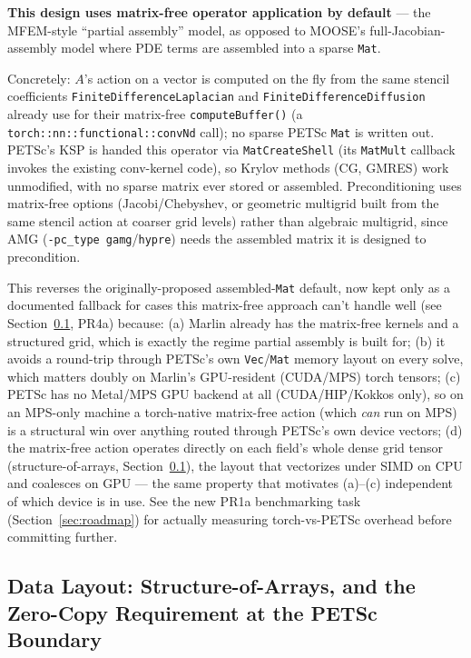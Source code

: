 \documentclass[11pt]{article}
\begin{document}
\begin{tcolorbox}[colback=lightgray, colframe=marlinblue, boxrule=0.6pt, arc=1mm]
\textbf{This design uses matrix-free operator application by default} ---
the MFEM-style ``partial assembly'' model, as opposed to MOOSE's
full-Jacobian-assembly model where PDE terms are assembled into a sparse
\texttt{Mat}.
\end{tcolorbox}

Concretely: $A$'s action on a vector is computed on the fly from the same
stencil coefficients \texttt{FiniteDifferenceLaplacian} and
\texttt{FiniteDifferenceDiffusion} already use for their matrix-free
\texttt{computeBuffer()} (a \texttt{torch::nn::functional::convNd} call);
no sparse PETSc \texttt{Mat} is written out. PETSc's KSP is handed
this operator via \texttt{MatCreateShell} (its \texttt{MatMult} callback
invokes the existing conv-kernel code), so Krylov methods (CG, GMRES) work
unmodified, with no sparse matrix ever stored or assembled.
Preconditioning uses matrix-free options (Jacobi/Chebyshev, or geometric
multigrid built from the same stencil action at coarser grid levels) rather
than algebraic multigrid, since AMG (\texttt{-pc\_type gamg}/\texttt{hypre})
needs the assembled matrix it is designed to precondition.

This reverses the originally-proposed assembled-\texttt{Mat} default, now
kept only as a documented fallback for cases this matrix-free approach
can't handle well (see Section~\ref{sec:soa}, PR4a) because: (a) Marlin already
has the matrix-free kernels and a structured grid, which is exactly the
regime partial assembly is built for; (b) it avoids a round-trip through
PETSc's own \texttt{Vec}/\texttt{Mat} memory layout on every solve, which
matters doubly on Marlin's GPU-resident (CUDA/MPS) torch tensors; (c) PETSc
has no Metal/MPS GPU backend at all (CUDA/HIP/Kokkos only), so on an
MPS-only machine a torch-native matrix-free action (which \textit{can} run
on MPS) is a structural win over anything routed through PETSc's own device
vectors; (d) the matrix-free action operates directly on each field's whole
dense grid tensor (structure-of-arrays, Section~\ref{sec:soa}), the layout
that vectorizes under SIMD on CPU and coalesces on GPU --- the same property
that motivates (a)--(c) independent of which device is in use. See the new
PR1a benchmarking task (Section~\ref{sec:roadmap}) for actually measuring
torch-vs-PETSc overhead before committing further.

\subsection{Data Layout: Structure-of-Arrays, and the Zero-Copy Requirement at the PETSc Boundary}
\label{sec:soa}
\end{document}
